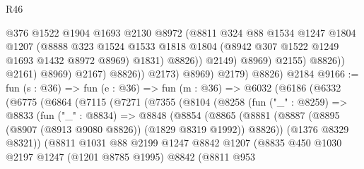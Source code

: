 \begin{lexlean}{R46}
\begin{coremodule}
                                  @376
                                  @1522
                                  @1904
                                  @1693
                                  @2130
                                  @8972
                                  (@8811
                                    @324
                                    @88
                                    @1534
                                    @1247
                                    @1804
                                    @1207
                                    (@8888
                                      @323
                                      @1524
                                      @1533
                                      @1818
                                      @1804
                                      (@8942 @307 @1522 @1249 @1693 @1432 @8972 @8969)
                                      @1831)
                                    @8826))
                                @2149)
                              @8969)
                            @2155)
                          @8826))
                      @2161)
                    @8969)
                  @2167)
                @8826))
            @2173)
          @8969)
        @2179)
      @8826)
    @2184
@9166 := fun (s : @36) =>
  fun (e : @36) =>
  fun (m : @36) =>
  @6032
    (@6186
      (@6332
        (@6775
          (@6864
            (@7115
              (@7271
                (@7355
                  (@8104
                    (@8258
                      (fun ("_" : @8259) =>
                      @8833
                        (fun ("_" : @8834) =>
                        @8848
                          (@8854
                            (@8865
                              (@8881
                                (@8887
                                  (@8895 (@8907 (@8913 @9080 @8826)) (@1829 @8319 @1992))
                                  @8826))
                              (@1376 @8329 @8321))
                            (@8811
                              @1031
                              @88
                              @2199
                              @1247
                              @8842
                              @1207
                              (@8835
                                @450
                                @1030
                                @2197
                                @1247
                                (@1201 @8785 @1995)
                                @8842
                                (@8811
                                  @953

\end{coremodule}
\end{lexlean}
